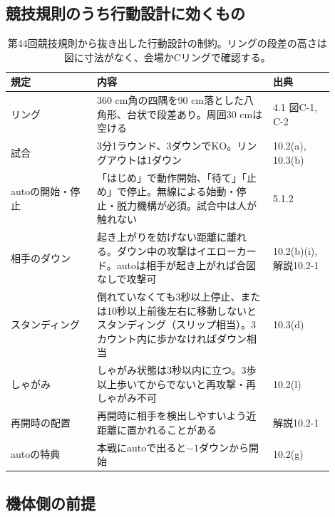 \documentclass[a4paper,11pt]{ltjsarticle}
\begin{document}
\subsection{競技規則のうち行動設計に効くもの}

\begin{table}[h]
\centering\small
\begin{tabular}{p{0.24\linewidth}p{0.49\linewidth}p{0.17\linewidth}}
\toprule
規定 & 内容 & 出典 \\
\midrule
リング & 360 cm角の四隅を90 cm落とした八角形、台状で段差あり。周囲30 cmは空ける & 4.1 図C-1, C-2 \\
試合 & 3分1ラウンド、3ダウンでKO。リングアウトは1ダウン & 10.2(a), 10.3(b) \\
autoの開始・停止 & 「はじめ」で動作開始、「待て」「止め」で停止。無線による始動・停止・脱力機構が必須。試合中は人が触れない & 5.1.2 \\
相手のダウン & 起き上がりを妨げない距離に離れる。ダウン中の攻撃はイエローカード。autoは相手が起き上がれば合図なしで攻撃可 & 10.2(b)(i), 解説10.2-1 \\
スタンディング & 倒れていなくても3秒以上停止、または10秒以上前後左右に移動しないとスタンディング（スリップ相当）。3カウント内に歩かなければダウン相当 & 10.3(d) \\
しゃがみ & しゃがみ状態は3秒以内に立つ。3歩以上歩いてからでないと再攻撃・再しゃがみ不可 & 10.2(l) \\
再開時の配置 & 再開時に相手を検出しやすいよう近距離に置かれることがある & 解説10.2-1 \\
autoの特典 & 本戦にautoで出ると$-1$ダウンから開始 & 10.2(g) \\
\bottomrule
\end{tabular}
\caption{第44回競技規則から抜き出した行動設計の制約。リングの段差の高さは図に寸法がなく、会場かCリングで確認する。}
\label{tab:rules}
\end{table}

\subsection{機体側の前提}
\end{document}
